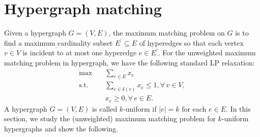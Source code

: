 \documentclass[11pt]{article}
\newtheorem{proposition}[theorem]{Proposition}
\theoremstyle{remark}
\begin{document}
  \section{Hypergraph matching}\label{sec:hypergraph-matching}
Given a hypergraph $G = (V, E)$, the maximum matching problem on $G$ is to find a maximum cardinality subset $E^\prime \subseteq E$ of hyperedges so that each vertex $v\in V$ is incident to at most one hyperedge $e \in E^\prime$. 
For the unweighted maximum matching problem in hypergraph, we have the following standard LP relaxation:
    \begin{align*}
      \max & \quad \sum_{e\in E} x_e \\
      \text{s.t.}
      & \quad \sum_{e\in\delta(v)} x_e \leq 1, \forall \, v\in V,\\
      & \quad x_e \geq 0, \forall \, e\in E.
    \end{align*}
A hypergraph $G = (V, E)$ is called $k$-uniform if $|e|=k$ for each $e \in E$. In this section, we study the (unweighted) maximum matching problem for $k$-uniform hypergraphs and show the following.

\hyper*
\end{document}
